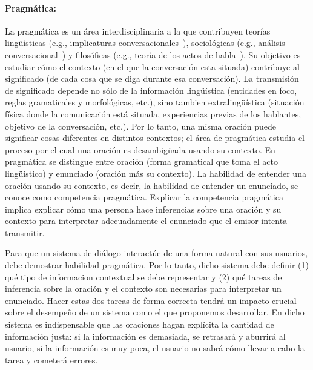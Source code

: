 \paragraph{Pragm\'atica:} La pragm\'atica es un \'area interdisciplinaria a
la que contribuyen teor\'ias ling\"u\'isticas (e.g., implicaturas
conversacionales~\citep{grice75}), sociol\'ogicas (e.g., an\'alisis
conversa\-cio\-nal~\citep{schegloff87b}) y filos\'oficas (e.g., teor\'ia de los actos
de habla~\citep{austin62}). Su objetivo es estudiar c\'omo el contexto (en el
que la conversaci\'on esta situada) contribuye al significado (de cada cosa que
se diga durante esa conversaci\'on). La transmisi\'on de significado depende no
s\'olo de la informaci\'on ling\"u\'istica (entidades en foco, reglas
gramaticales y morfol\'ogicas, etc.), sino tambien extraling\"u\'istica
(situaci\'on f\'isica donde la comunicaci\'on est\'a situada, experiencias
previas de los hablantes, objetivo de la conversaci\'on, etc.). Por lo tanto,
una misma oraci\'on puede significar cosas diferentes en distintos contextos; el
\'area de pragm\'atica estudia el proceso por el cual una oraci\'on es
desambig\"uada usando su contexto. En pragm\'atica se distingue entre oraci\'on
(forma gramatical que toma el acto ling\"u\'istico) y enunciado (oraci\'on m\'as su
contexto). La habilidad de entender una oraci\'on usando su contexto, es decir,
la habilidad de entender un enunciado, se conoce como competencia pragm\'atica.
Explicar la competencia pragm\'atica implica explicar c\'omo una persona hace
inferencias sobre una oraci\'on y su contexto para interpretar adecuadamente el
enunciado que el emisor intenta transmitir. 

Para que un sistema de di\'alogo interact\'ue de una forma natural con sus
usuarios, debe demostrar habilidad pragm\'atica. Por lo tanto, dicho sistema
debe definir (1) qu\'e tipo de informacion contextual se debe representar y (2)
qu\'e tareas de inferencia sobre la oraci\'on y el contexto son necesarias para
interpretar un enunciado. Hacer estas dos tareas de forma correcta tendr\'a un
impacto crucial sobre el desempe\~no de un sistema como el que proponemos
desarrollar. En dicho sistema es indispensable que las oraciones hagan
expl\'icita la cantidad de informaci\'on justa: si la informaci\'on es
demasiada, se retrasar\'a y aburrir\'a al usuario, si la informaci\'on es muy
poca, el usuario no sabr\'a c\'omo llevar a cabo la tarea y cometer\'a errores. 

%
%

